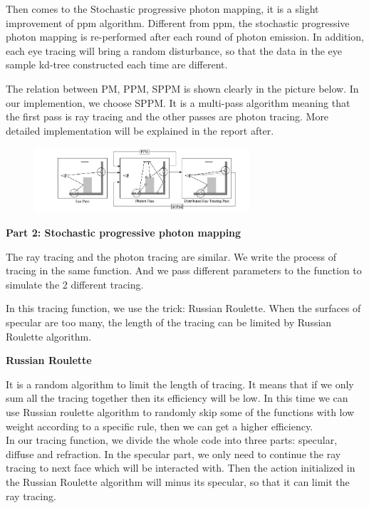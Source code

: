 \documentclass[acmtog]{acmart}
\begin{document}
Then comes to the Stochastic progressive photon mapping, it is a slight improvement of ppm algorithm. Different from ppm, the stochastic progressive photon mapping is re-performed after each round of photon emission. In addition, each eye tracing will bring a random disturbance, so that the data in the eye sample kd-tree constructed each time are different.

The relation between PM, PPM, SPPM is shown clearly in the picture below.
In our implemention, we choose SPPM. It is a multi-pass algorithm meaning that the first pass is ray tracing and the other passes are photon tracing. More detailed implementation will be explained in the report after.
\begin{figure}[h]
	\centering
	{\includegraphics[width=8cm]{SPPM.JPG}}
\end{figure}

\quad \textbf{Part 2: Stochastic progressive photon mapping}

The ray tracing and the photon tracing are similar. We write the process of tracing in the same function. And we pass different parameters to the function to simulate the 2 different tracing.

In this tracing function, we use the trick: Russian Roulette. When the surfaces of specular are too many, the length of the tracing can be limited by Russian Roulette algorithm.

\quad \textbf{Russian Roulette}

It is a random algorithm to limit the length of tracing. It means that if we only sum all the tracing together then its efficiency will be low. In this time we can use Russian roulette algorithm to randomly skip some of the functions with low weight according to a specific rule, then we can get a higher efficiency. \\


In our tracing function, we divide the whole code into three parts: specular, diffuse and refraction. In the specular part, we only need to continue the ray tracing to next face which will be interacted with. Then the action initialized in the Russian Roulette algorithm will minus its specular, so that it can limit the ray tracing.
\end{document}
